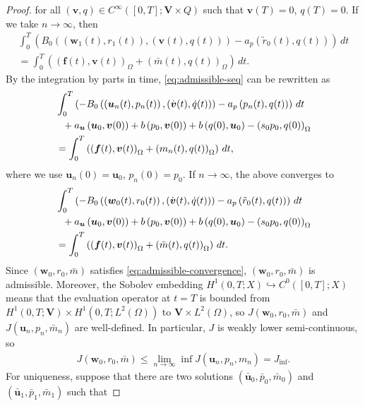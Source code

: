 \documentclass{amsart}
\newcommand{\algn}[1]{\begin{align} #1 \end{align}}
\newcommand{\LRp}[1]{\left( #1 \right)}
\begin{document}
\begin{proof}
{	}
	for all $\LRp{\boldsymbol{v}, q} \in C^{\infty} \LRp{[0, T]; \boldsymbol{V} \times Q}$ such that $\boldsymbol{v} (T) = 0$, $q(T) = 0$. If we take $n \to \infty$, then
	\algn{
		\nonumber \int_0^T \LRp{B_0 \LRp{\LRp{\boldsymbol{w}_1 (t), r_1 (t)}, \LRp{\boldsymbol{v} (t), q(t)}} - a_p\LRp{ \tilde{r}_0 (t), q(t)}} \, dt \\
		\nonumber = \int_0^T \LRp{\LRp{\boldsymbol{f}(t), \boldsymbol{v} (t)}_{\Omega} + \LRp{\bar{m}(t), q(t)}_{\Omega}} \, dt.
	}
	By the integration by parts in time, \eqref{eq:admissible-seq} can be rewritten as
	\algn{
		\nonumber &\int_0^T \LRp{-B_0 \LRp{\LRp{\boldsymbol{u}_n (t), p_n (t)}, \LRp{\dot{\boldsymbol{v}}(t), \dot{q}(t)}} - a_p\LRp{ p_n (t), q (t)}} \, dt \\ 
		\notag
		& \ \ + a_{\boldsymbol{u}} \LRp{\boldsymbol{u}_0, \boldsymbol{v} (0)} + b \LRp{p_0, \boldsymbol{v} (0)} + b \LRp{q(0), \boldsymbol{u}_0} - \LRp{s_0 p_0, q (0)}_{\Omega} \\ \notag
		&= \int_0^T \LRp{\LRp{\boldsymbol{f} (t), \boldsymbol{v} (t)}_{\Omega} + \LRp{m_n (t), q (t)}_{\Omega}} \, dt,
	}
	where we use $\boldsymbol{u}_n (0) = \boldsymbol{u}_0$, $p_n (0) = p_0$. If $n \to \infty$, the above converges to
	\algn{ \label{eq:admissible-convergence}
		&\int_0^T \LRp{-B_0 \LRp{\LRp{\boldsymbol{w}_0 (t), r_0 (t)}, \LRp{\dot{\boldsymbol{v}}(t), \dot{q}(t)}} - a_p\LRp{ \tilde{r}_0 (t), q (t)}} \, dt \\ \notag
		& \ \ + a_{\boldsymbol{u}} \LRp{\boldsymbol{u}_0, \boldsymbol{v} (0)} + b \LRp{p_0, \boldsymbol{v} (0)} + b \LRp{q(0), \boldsymbol{u}_0} - \LRp{s_0 p_0, q (0)}_{\Omega} \\ \notag
		&= \int_0^T \LRp{\LRp{\boldsymbol{f} (t), \boldsymbol{v} (t)}_{\Omega} + \LRp{\bar{m} (t), q (t)}_{\Omega}} \, dt .
	}
    Since $\LRp{\boldsymbol{w}_0, r_0, \bar{m}}$ satisfies \eqref{eq:admissible-convergence}, $\LRp{\boldsymbol{w}_0, r_0, \bar{m}}$ is admissible. Moreover, the Sobolev embedding $H^1(0,T; X) \hookrightarrow C^0([0,T]; X)$ means that the evaluation operator at $t=T$ is bounded from $H^1(0,T; \boldsymbol{V})\times H^1(0,T;L^2(\Omega))$ to $\boldsymbol{V} \times L^2(\Omega)$, so $J ({\boldsymbol{w}}_0, r_0, \bar{m})$ and $J ({\boldsymbol{u}}_n, p_n, \bar{m}_n)$ are well-defined. In particular, $J$ is weakly lower semi-continuous, so 
	\algn{
		\nonumber J \LRp{{\boldsymbol{w}}_0, r_0, \bar{m}} \le \lim_{n \to \infty} \inf J \LRp{\boldsymbol{u}_n, p_n, m_n} = J_{\inf}.
	}
	For uniqueness, suppose that there are two solutions $\LRp{\bar{\boldsymbol{u}}_0, \bar{p}_0, \bar{m}_0}$ and $\LRp{\bar{\boldsymbol{u}}_1, \bar{p}_1, \bar{m}_1}$ such that

\end{proof}
\end{document}
